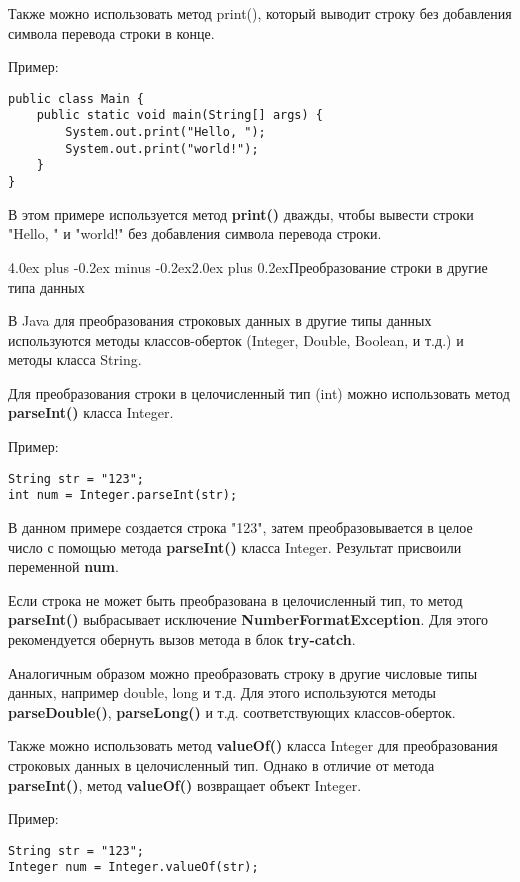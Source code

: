 \documentclass[12pt, a4paper]{book}%
\makeatletter
\renewcommand{\section}{\@startsection{section}{1}{1pt}%
{4.0ex plus -0.2ex minus -0.2ex}{2.0ex plus 0.2ex}{\centering\bf}}%
\makeatother
\begin{document}
{Также можно использовать метод print(), который выводит строку без добавления символа перевода строки в конце. 

Пример:

\begin{lstlisting}
public class Main {
    public static void main(String[] args) {
        System.out.print("Hello, ");
        System.out.print("world!");
    }
}
\end{lstlisting}

В этом примере используется метод {\bf print()} дважды, чтобы вывести строки "Hello, " и "world!" без добавления символа перевода строки.


\section{Преобразование строки в другие типа данных}

В Java для преобразования строковых данных в другие типы данных используются методы классов-оберток (Integer, Double, Boolean, и т.д.) и методы класса String.

Для преобразования строки в целочисленный тип (int) можно использовать метод {\bf parseInt()} класса Integer. 

Пример:

\begin{lstlisting}
String str = "123";
int num = Integer.parseInt(str);
\end{lstlisting}

В данном примере создается строка "123", затем преобразовывается в целое число с помощью метода {\bf parseInt()} класса Integer. Результат присвоили переменной {\bf num}.

Если строка не может быть преобразована в целочисленный тип, то метод {\bf parseInt()} выбрасывает исключение {\bf NumberFormatException}. Для этого рекомендуется обернуть вызов метода в блок {\bf try-catch}.

Аналогичным образом можно преобразовать строку в другие числовые типы данных, например double, long и т.д. Для этого используются методы {\bf parseDouble()}, {\bf parseLong()} и т.д. соответствующих классов-оберток.

Также можно использовать метод {\bf valueOf()} класса Integer для преобразования строковых данных в целочисленный тип. Однако в отличие от метода {\bf parseInt()}, метод {\bf valueOf()} возвращает объект Integer. 

Пример:

\begin{lstlisting}
String str = "123";
Integer num = Integer.valueOf(str);
\end{lstlisting}

}
\end{document}
